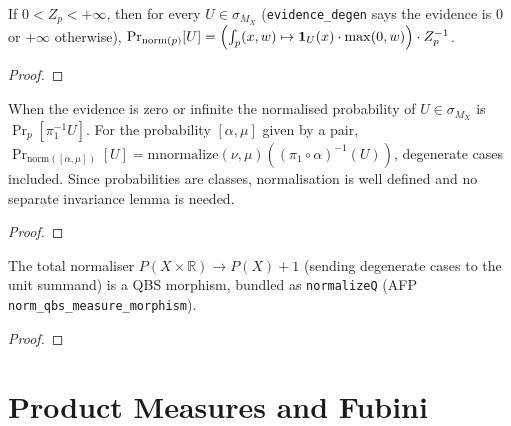 \begin{lemma}\label{lem:normalize_event}
  \rocqok
  If $0 < Z_p < +\infty$, then for every $U \in \sigma_{M_X}$ (\texttt{evidence\_degen} says the evidence is $0$ or $+\infty$ otherwise),
  $\Pr_{\mathrm{norm}(p)}[U] =
  \Bigl(\int_p (x, w) \mapsto \mathbf{1}_U(x) \cdot \max(0, w)\Bigr)
  \cdot Z_p^{-1}$.
\end{lemma}
\begin{proof}\rocqok\end{proof}

\begin{lemma}\label{lem:normalize_prob_event_mk}
  \rocqok
  When the evidence is zero or infinite the normalised probability of $U \in \sigma_{M_X}$ is $\Pr_p[\pi_1^{-1} U]$. For the probability $[\alpha, \mu]$ given by a pair, $\Pr_{\mathrm{norm}([\alpha, \mu])}[U] = \mathrm{mnormalize}(\nu, \mu)((\pi_1 \circ \alpha)^{-1}(U))$, degenerate cases included. Since probabilities are classes, normalisation is well defined and no separate invariance lemma is needed.
\end{lemma}
\begin{proof}\rocqok\end{proof}

\begin{theorem}\label{thm:qbs_morphism_normalize}
  \rocqok
  The total normaliser $P(X \times \mathbb{R}) \to P(X) + 1$ (sending degenerate cases to the unit summand) is a QBS morphism, bundled as \texttt{normalizeQ} (AFP \texttt{norm\_qbs\_measure\_morphism}).
\end{theorem}
\begin{proof}\rocqok\end{proof}


\section{Product Measures and Fubini}\label{sec:fubini}


